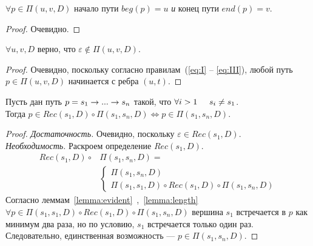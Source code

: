 \begin{lm}
\label{lemma:evident}
$\forall p \in \Pi(u,v,D)$ начало пути $beg(p) = u$ \emph{и} конец пути $end(p) = v$.
\end{lm}
\begin{proof}
Очевидно.
\end{proof}

\begin{lm}
\label{lemma:length}
$\forall u,v,D$ верно, что $\varepsilon \notin \Pi(u,v,D)$.
\end{lm}
\begin{proof}
Очевидно, поскольку согласно правилам~(\ref{eq:I} -- \ref{eq:III}), любой путь $p \in \Pi(u,v,D)$ начинается с ребра $(u,t)$.
\end{proof}

\begin{lm}
\label{lemma:reduction}
Пусть дан путь $p = s_1 \rightarrow ... \rightarrow s_n$ такой, что $\forall i > 1 \hspace{5mm} s_i \neq s_1$. \\
Тогда $p \in Rec(s_1,D) \circ \Pi(s_1, s_n, D) \iff p \in \Pi(s_1,s_n,D)$.
\end{lm}

\begin{proof}
\emph{Достаточность.} Очевидно, поскольку $\varepsilon \in Rec(s_1,D)$. \\
\emph{Необходимость.} Раскроем определение $Rec(s_1,D)$.\\
\begin{equation}
    \begin{aligned}
    Rec(s_1,D) \circ & \Pi(s_1,s_n,D) = \\ 
                     & \begin{cases} 
            \Pi(s_1,s_n,D) \\
            \Pi(s_1,s_1,D) \circ Rec(s_1,D) \circ \Pi(s_1, s_n,D)
            \end{cases}
    \end{aligned}
\end{equation}
Согласно леммам~\ref{lemma:evident}~,~\ref{lemma:length} $\forall p \in \Pi(s_1, s_1,D) \circ Rec(s_1,D) \circ \Pi(s_1, s_n,D)$
вершина $s_1$ встречается в $p$ как минимум два раза, но по условию, $s_1$ встречается только один раз.
Следовательно, единственная возможность --- $p \in \Pi(s_1,s_n,D)$.
\end{proof}

